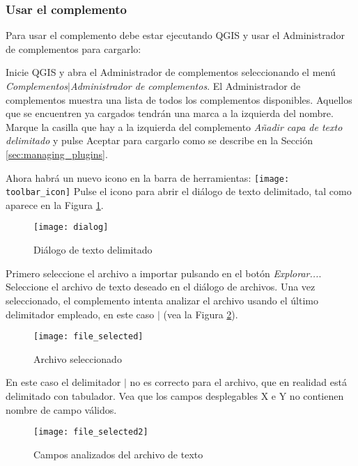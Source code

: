 \subsubsection{Usar el complemento}
Para usar el complemento debe estar ejecutando QGIS y usar el Administrador de 
complementos para cargarlo:

Inicie QGIS y abra el Administrador de complementos seleccionando el menú {\em
Complementos\mbox{$|$}Administrador de complementos}. El Administrador de complementos 
muestra una lista de todos los complementos disponibles. Aquellos que se encuentren ya 
cargados tendrán una marca a la izquierda del nombre. Marque la casilla que hay a la 
izquierda del complemento {\em Añadir capa de texto delimitado} y pulse Aceptar para 
cargarlo como se describe en la Sección \ref{sec:managing_plugins}.


Ahora habrá un nuevo icono en la barra de herramientas:
\texttt{[image: toolbar\_icon]}
Pulse el icono para abrir el diálogo de texto delimitado, tal como aparece en la Figura
\ref{fig:delim_text_plugin_dialog}.

\begin{figure}[ht]
   \begin{center}
   \caption{Diálogo de texto delimitado}\label{fig:delim_text_plugin_dialog}\smallskip
\texttt{[image: dialog]}
   \end{center}  
\end{figure}

Primero seleccione el archivo a importar pulsando en el botón \textit{Explorar...}.
Seleccione el archivo de texto deseado en el diálogo de archivos. Una vez seleccionado, 
el complemento intenta analizar el archivo usando el último delimitador empleado, en 
este caso \mbox{$|$} (vea la Figura \ref{fig:delim_text_file_selected}).

\begin{figure}[ht]
   \begin{center}
   \caption{Archivo seleccionado}\label{fig:delim_text_file_selected}\smallskip
\texttt{[image: file\_selected]}   
   \end{center}  
\end{figure}
  
En este caso el delimitador \mbox{$|$} no es correcto para el archivo, que en
realidad está delimitado con tabulador. Vea que los campos desplegables X e Y
no contienen nombre de campo válidos.

\begin{figure}[ht]
   \begin{center}
   \caption{Campos analizados del archivo de texto}\label{fig:delim_text_file_selected2}\smallskip  
\texttt{[image: file\_selected2]}
   \end{center}  
\end{figure}

